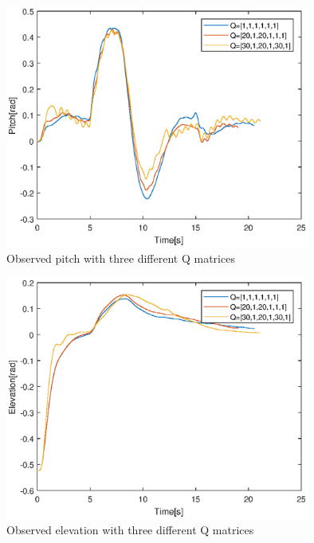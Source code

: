 \begin{figure}[H]
\includegraphics[width=1\linewidth, height=8cm]{data_10.4/pitch_eps.eps} 
\centering
\caption{Observed pitch with three different Q matrices}\label{fig:pitch1}
\end{figure}

\begin{figure}[H]
\includegraphics[width=1\linewidth, height=8cm]{data_10.4/elevation_eps.eps} 
\centering
\caption{Observed elevation with three different Q matrices}\label{fig:elevation1}
\end{figure}

